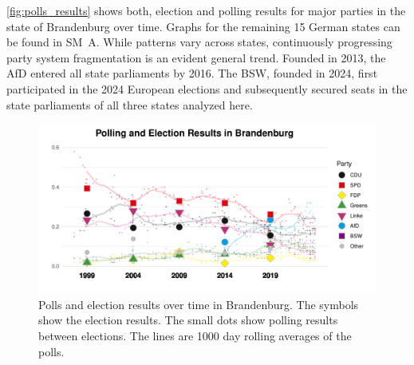 \documentclass[doublespaced,12pt]{article}
\begin{document}
\begin{doublespacing}
\autoref{fig:polls_results} shows both,  election and polling results for major parties in the state of Brandenburg over time. Graphs for the remaining 15 German states can be found in SM~A. While patterns vary across states, continuously progressing party system fragmentation is an evident general trend. Founded in 2013, the AfD entered all state parliaments by 2016. The BSW, founded in 2024, first participated in the 2024 European elections and subsequently secured seats in the state parliaments of all three states analyzed here. %


\begin{figure}[!t]
    \centering
    \includegraphics[width=\textwidth]{fg1_fig_poll_bb.pdf}  
    \caption{Polls and election results over time in Brandenburg. The symbols show the election results. The small dots show polling results between elections. The lines are 1000 day rolling averages of the polls.}
    \label{fig:polls_results}
\end{figure}


\end{doublespacing}
\end{document}
